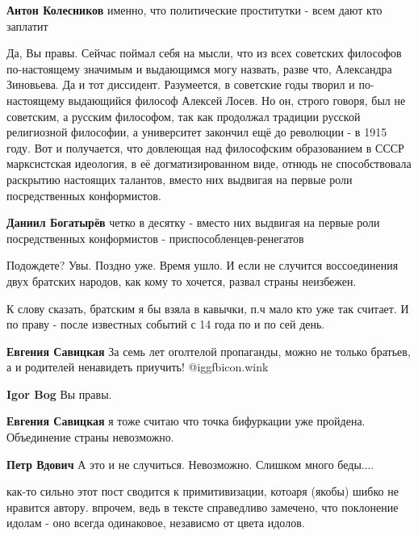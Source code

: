 \begin{itemize}
\textbf{Антон Колесников} именно, что политические проститутки - всем дают кто заплатит


Да, Вы правы. Сейчас поймал себя на мысли, что из всех советских философов
по-настоящему значимым и выдающимся могу назвать, разве что, Александра
Зиновьева. Да и тот диссидент. Разумеется, в советские годы творил и
по-настоящему выдающийся философ Алексей Лосев. Но он, строго говоря, был не
советским, а русским философом, так как продолжал традиции русской религиозной
философии, а университет закончил ещё до революции - в 1915 году. Вот и
получается, что довлеющая над философским образованием в СССР марксистская
идеология, в её догматизированном виде, отнюдь не способствовала раскрытию
настоящих талантов, вместо них выдвигая на первые роли посредственных
конформистов.


\textbf{Даниил Богатырёв} четко в десятку - вместо них выдвигая на первые роли посредственных конформистов - приспособленцев-ренегатов


Подождете? Увы. Поздно уже. Время ушло. И если не случится воссоединения двух
братских народов, как кому то хочется, развал страны неизбежен.

К слову сказать, братским я бы взяла в кавычки, п.ч мало кто уже так считает. И
по праву - после известных событий с 14 года по и по сей день.

\begin{itemize} %
\textbf{Евгения Савицкая} За семь лет оголтелой пропаганды, можно не только братьев, а и родителей ненавидеть приучить!  @igg{fbicon.wink} 

\textbf{Igor Bog}
Вы правы.

\textbf{Евгения Савицкая} я тоже считаю что точка бифуркации уже пройдена.
Объединение страны невозможно.

\textbf{Петр Вдович}
А это и не случиться. Невозможно. Слишком много беды....

\end{itemize} %


как-то сильно этот пост сводится к примитивизации, котоаря (якобы) шибко не
нравится автору. впрочем, ведь в тексте справедливо замечено, что поклонение
идолам - оно всегда одинаковое, независмо от цвета идолов.


\end{itemize}
